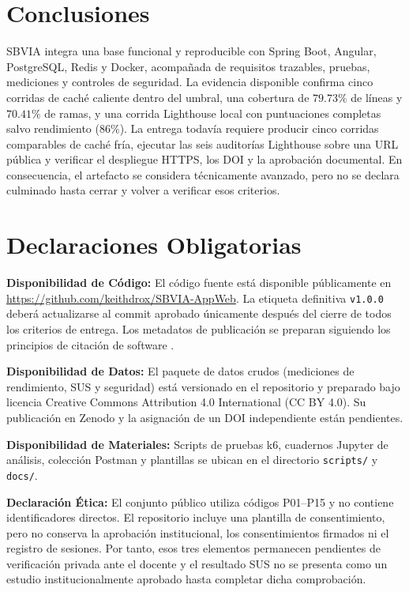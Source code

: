 \documentclass[11pt,a4paper]{report}
\begin{document}
\chapter{Conclusiones}
SBVIA integra una base funcional y reproducible con Spring Boot, Angular, PostgreSQL, Redis y Docker, acompañada de requisitos trazables, pruebas, mediciones y controles de seguridad. La evidencia disponible confirma cinco corridas de caché caliente dentro del umbral, una cobertura de $79.73\%$ de líneas y $70.41\%$ de ramas, y una corrida Lighthouse local con puntuaciones completas salvo rendimiento ($86\%$). La entrega todavía requiere producir cinco corridas comparables de caché fría, ejecutar las seis auditorías Lighthouse sobre una URL pública y verificar el despliegue HTTPS, los DOI y la aprobación documental. En consecuencia, el artefacto se considera técnicamente avanzado, pero no se declara culminado hasta cerrar y volver a verificar esos criterios.

\chapter*{Declaraciones Obligatorias}

\textbf{Disponibilidad de Código:} El código fuente está disponible públicamente en \url{https://github.com/keithdrox/SBVIA-AppWeb}. La etiqueta definitiva \texttt{v1.0.0} deberá actualizarse al commit aprobado únicamente después del cierre de todos los criterios de entrega. Los metadatos de publicación se preparan siguiendo los principios de citación de software \cite{smith2016software}.

\textbf{Disponibilidad de Datos:} El paquete de datos crudos (mediciones de rendimiento, SUS y seguridad) está versionado en el repositorio y preparado bajo licencia Creative Commons Attribution 4.0 International (CC BY 4.0). Su publicación en Zenodo y la asignación de un DOI independiente están pendientes.

\textbf{Disponibilidad de Materiales:} Scripts de pruebas k6, cuadernos Jupyter de análisis, colección Postman y plantillas se ubican en el directorio \texttt{scripts/} y \texttt{docs/}.

\textbf{Declaración Ética:} El conjunto público utiliza códigos P01--P15 y no contiene identificadores directos. El repositorio incluye una plantilla de consentimiento, pero no conserva la aprobación institucional, los consentimientos firmados ni el registro de sesiones. Por tanto, esos tres elementos permanecen pendientes de verificación privada ante el docente y el resultado SUS no se presenta como un estudio institucionalmente aprobado hasta completar dicha comprobación.
\end{document}
